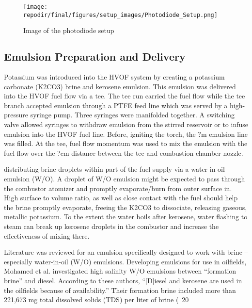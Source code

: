 \begin{figure}[]
    \centering
    \texttt{[image: \\repodir/final/figures/setup\_images/Photodiode\_Setup.png]}
    \caption{Image of the photodiode setup}
    \label{fig:SI_PD_setup_image}
\end{figure}






\clearpage
\subsection{Emulsion Preparation and Delivery}

Potassium was introduced into the HVOF system by creating a potassium carbonate (K2CO3) brine and kerosene emulsion. This emulsion was delivered into the HVOF fuel flow via a tee. The tee run carried the fuel flow while the tee branch accepted emulsion through a PTFE feed line which was served by a high-pressure syringe pump. Three syringes were manifolded together. A switching valve allowed syringes to withdraw emulsion from the stirred reservoir or to infuse emulsion into the HVOF fuel line. Before, igniting the torch, the ?m emulsion line was filled. At the tee, fuel flow momentum was used to mix the emulsion with the fuel flow over the ?cm distance between the tee and combustion chamber nozzle. 


distributing brine droplets within part of the fuel supply via a water-in-oil emulsion (W/O). A droplet of W/O emulsion might be expected to pass through the combustor atomizer and promptly evaporate/burn from outer surface in. High surface to volume ratio, as well as close contact with the fuel should help the brine promptly evaporate, freeing the K2CO3 to dissociate, releasing gaseous, metallic potassium. To the extent the water boils after kerosene, water flashing to steam can break up kerosene droplets in the combustor and increase the effectiveness of mixing there. 

Literature was reviewed for an emulsion specifically designed to work with brine – especially water-in-oil (W/O) emulsions.  Developing emulsions for use in oilfields, Mohamed et al.\cite{mohamedInfluenceSurfactantStructure2017a} investigated high salinity W/O emulsions between “formation brine” and diesel. According to these authors, “[D]iesel and kerosene are used in the oilfields because of availability.” Their formation brine included more than 221,673 mg total dissolved solids (TDS) per liter of brine (~20%

